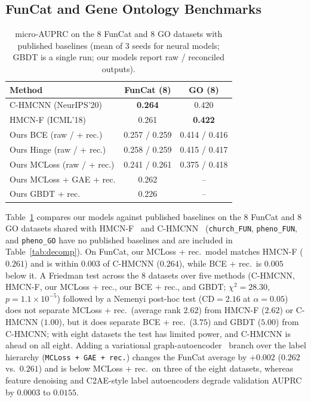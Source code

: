 \documentclass[conference]{IEEEtran}
\begin{document}
\subsection{FunCat and Gene Ontology Benchmarks}
\label{sec:funcat_go}

\begin{table}[t]
\caption{micro-AUPRC on the 8 FunCat and 8 GO datasets with published baselines
(mean of 3 seeds for neural models; GBDT is a single run; our models report raw /
reconciled outputs).}
\label{tab:main}
\centering
\footnotesize
\begin{tabular}{lcc}
\toprule
Method & FunCat (8) & GO (8) \\
\midrule
C-HMCNN (NeurIPS'20)~\cite{chmcnn} & \textbf{0.264} & 0.420 \\
HMCN-F (ICML'18)~\cite{weihs2018hmc} & 0.261 & \textbf{0.422} \\
\midrule
Ours BCE (raw / + rec.) & 0.257 / 0.259 & 0.414 / 0.416 \\
Ours Hinge (raw / + rec.) & 0.258 / 0.259 & 0.415 / 0.417 \\
Ours MCLoss (raw / + rec.) & 0.241 / 0.261 & 0.375 / 0.418 \\
Ours MCLoss + GAE + rec. & 0.262 & -- \\
Ours GBDT + rec. & 0.226 & -- \\
\bottomrule
\end{tabular}
\end{table}

Table~\ref{tab:main} compares our models against published baselines on the 8
FunCat and 8 GO datasets shared with HMCN-F~\cite{weihs2018hmc} and
C-HMCNN~\cite{chmcnn} (\texttt{church\_FUN}, \texttt{pheno\_FUN}, and
\texttt{pheno\_GO} have no published baselines and are included in
Table~\ref{tab:decomp}). On FunCat, our MCLoss + rec.\ model matches HMCN-F
($0.261$) and is within $0.003$ of C-HMCNN ($0.264$), while BCE + rec.\ is $0.005$ below it. A Friedman test
across the 8 datasets over five methods (C-HMCNN, HMCN-F, our MCLoss + rec.,
our BCE + rec., and GBDT; $\chi^2 = 28.30$, $p = 1.1\times 10^{-5}$) followed by
a Nemenyi post-hoc test ($\text{CD} = 2.16$ at $\alpha = 0.05$) does not
separate MCLoss + rec.\ (average rank $2.62$) from HMCN-F ($2.62$) or C-HMCNN
($1.00$), but it does separate BCE + rec.\ ($3.75$) and GBDT ($5.00$) from
C-HMCNN; with eight datasets the test has limited power, and C-HMCNN is ahead
on all eight.
Adding a variational graph-autoencoder~\cite{kipf2016vgae} branch over the label
hierarchy (\texttt{MCLoss + GAE + rec.}) changes the FunCat average by $+0.002$
($0.262$ vs.\ $0.261$) and is below MCLoss + rec.\ on three of the eight
datasets, whereas feature denoising and
C2AE-style label autoencoders degrade validation AUPRC by $0.0003$ to $0.0155$.
\end{document}
